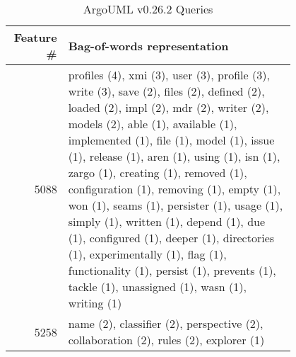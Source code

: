 \begin{table}[h]
\renewcommand{\arraystretch}{1.3}
\footnotesize
\centering
\caption{ArgoUML v0.26.2 Queries}
\begin{tabular}{r|p{0.8\linewidth}}
\toprule
Feature \# & Bag-of-words representation  \\
\midrule
5088       &

profiles (4),
xmi (3),
user (3),
profile (3),
write (3),
save (2),
files (2),
defined (2),
loaded (2),
impl (2),
mdr (2),
writer (2),
models (2),
able (1),
available (1),
implemented (1),
file (1),
model (1),
issue (1),
release (1),
aren (1),
using (1),
isn (1),
zargo (1),
creating (1),
removed (1),
configuration (1),
removing (1),
empty (1),
won (1),
seams (1),
persister (1),
usage (1),
simply (1),
written (1),
depend (1),
due (1),
configured (1),
deeper (1),
directories (1),
experimentally (1),
flag (1),
functionality (1),
persist (1),
prevents (1),
tackle (1),
unassigned (1),
wasn (1),
writing (1)

\\
5258       &

name (2),
classifier (2),
perspective (2),
collaboration (2),
rules (2),
explorer (1)

\\
\bottomrule
\end{tabular}
\label{table:argoumlqueries}
\end{table}

